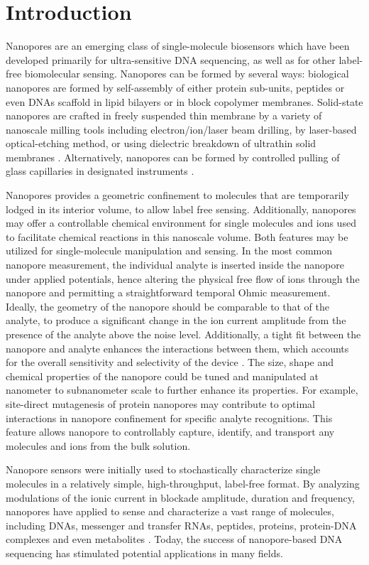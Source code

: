 \section{Introduction}
Nanopores are an emerging class of single-molecule biosensors which have been developed primarily for ultra-sensitive DNA sequencing, as well as for other label-free biomol\-ecular sensing. Nanopores can be formed by several ways: biological nanopores are formed by self-assembly of either protein sub-units, peptides or even DNAs scaffold in lipid bilayers or in block copolymer membranes. Solid-state nanopores are crafted in freely suspended thin membrane by a variety of nanoscale milling tools including electron/ion/laser beam drilling, by la\-ser-based optical-etching method, or using dielectric breakdown of ultrathin solid membranes \cite{Varongchayakul2018,Ying2018,Restrepo-Perez2018,McGinn2016}. Alternatively, nanopores can be formed by controlled pulling of glass capillaries in designated instruments \cite{Yu2019}. 


Nanopores provides a geometric confinement to molecules that are temporarily lo\-dged in its interior volume, to allow label free sensing. Additionally, nanopores may offer a controllable chemical environment for single molecules and ions used to facilitate chemical reactions in this nanoscale volume. Both features may be utilized for single-molecule manipulation and sensing. In the most common nanopore measurement, the individual analyte is inserted inside the nanopore under applied potentials, hence altering the physical free flow of ions through the nanopore and permitting a straightforward temporal Ohmic measurement. Ideally, the geometry of the nanopore should be comparable to that of the analyte, to produce a significant change in the ion current amplitude from the presence of the analyte above the noise level. Additionally, a tight fit between the nanopore and analyte enhances the interactions between them, which accounts for the overall sensitivity and selectivity of the device \cite{Meller2003}. The size, shape and chemical properties of the nanopore could be tuned and manipulated at nanometer to subnanometer scale to further enhance its properties. For example, site-direct mutagenesis of protein nanopores may contribute to optimal interactions in nanopore confinement for specific analyte recognitions. This feature allows nanopore to controllably capture, identify, and transport any molecules and ions from the bulk solution. 


Nanopore sensors were initially used to stochastically characterize single molecules in a relatively simple, high-throughput, label-free format. By analyzing modulations of the ionic current in blockade amplitude, duration and frequency, nanopores have applied to sense and characterize a vast range of molecules, including DNAs, messenger and transfer RNAs, peptides, proteins, protein-DNA complexes and even metabolites \cite{Liu2021,Cao2016,Galenkamp2018,Zhang2017,Wanunu2010,Nir2015,Squires2015a,Depledge2019}. Today, the success of nanopore-based DNA sequencing has stimulated potential applications in many fields.


